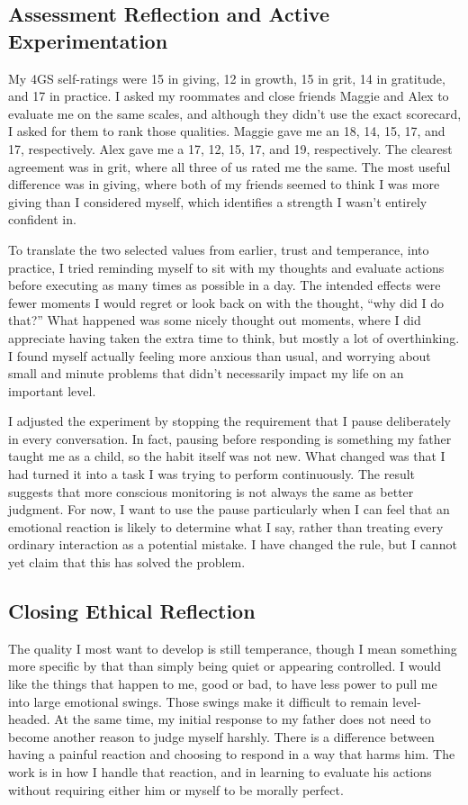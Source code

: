 \documentclass[12pt,stu,biblatex]{apa7}
\begin{document}
\subsection{Assessment Reflection and Active Experimentation}
My 4GS self-ratings were 15 in giving, 12 in growth, 15 in grit, 14 in gratitude, and 17 in practice.
I asked my roommates and close friends Maggie and Alex to evaluate me on the same scales, and although they didn't use the exact scorecard, I asked for them to rank those qualities.
Maggie gave me an 18, 14, 15, 17, and 17, respectively.
Alex gave me a 17, 12, 15, 17, and 19, respectively.
The clearest agreement was in grit, where all three of us rated me the same.
The most useful difference was in giving, where both of my friends seemed to think I was more giving than I considered myself, which identifies a strength I wasn't entirely confident in.

To translate the two selected values from earlier, trust and temperance, into practice, I tried reminding myself to sit with my thoughts and evaluate actions before executing as many times as possible in a day.
The intended effects were fewer moments I would regret or look back on with the thought, ``why did I do that?''
What happened was some nicely thought out moments, where I did appreciate having taken the extra time to think, but mostly a lot of overthinking.
I found myself actually feeling more anxious than usual, and worrying about small and minute problems that didn't necessarily impact my life on an important level.

I adjusted the experiment by stopping the requirement that I pause deliberately in every conversation.
In fact, pausing before responding is something my father taught me as a child, so the habit itself was not new.
What changed was that I had turned it into a task I was trying to perform continuously.
The result suggests that more conscious monitoring is not always the same as better judgment.
For now, I want to use the pause particularly when I can feel that an emotional reaction is likely to determine what I say, rather than treating every ordinary interaction as a potential mistake.
I have changed the rule, but I cannot yet claim that this has solved the problem.

\subsection{Closing Ethical Reflection}
The quality I most want to develop is still temperance, though I mean something more specific by that than simply being quiet or appearing controlled.
I would like the things that happen to me, good or bad, to have less power to pull me into large emotional swings.
Those swings make it difficult to remain level-headed.
At the same time, my initial response to my father does not need to become another reason to judge myself harshly.
There is a difference between having a painful reaction and choosing to respond in a way that harms him.
The work is in how I handle that reaction, and in learning to evaluate his actions without requiring either him or myself to be morally perfect.
\end{document}
